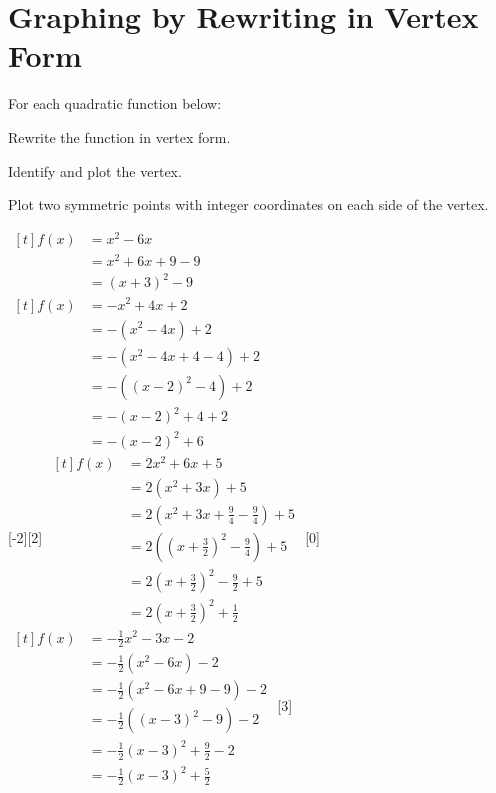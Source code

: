 \section*{Graphing by Rewriting in Vertex Form}
For each quadratic function below:
\begin{clist}
\item Rewrite the function in vertex form.
\item Identify and plot the vertex.
\item Plot two symmetric points with integer coordinates on each side of the vertex.
\end{clist}
\begin{smenum}
\mitemxx
{$\begin{aligned}[t]
f(x)&=x^2-6x\\
&=x^2+6x+9-9\\
&=(x+3)^2-9
\end{aligned}$\\
}
{$\begin{aligned}[t]
f(x)&=-x^2+4x+2\\
&=-\left(x^2-4x\right)+2\\
&=-\left(x^2-4x+4-4\right)+2\\
&=-\left((x-2)^2-4\right)+2\\
&=-(x-2)^2+4+2\\
&=-(x-2)^2+6
\end{aligned}$\\
[-2][2]
}
\mitemxx
{$\begin{aligned}[t]
f(x)&=2x^2+6x+5\\
&=2\left(x^2+3x\right)+5\\
&=2\left(x^2+3x+\tfrac{9}{4}-\tfrac{9}{4}\right)+5\\
&=2\left(\left(x+\tfrac{3}{2}\right)^2-\tfrac{9}{4}\right)+5\\
&=2\left(x+\tfrac{3}{2}\right)^2-\tfrac{9}{2}+5\\
&=2\left(x+\tfrac{3}{2}\right)^2+\tfrac{1}{2}
\end{aligned}$
[0]
}{$\begin{aligned}[t]
f(x)&=-\frac{1}{2}x^2-3x-2\\
&=-\frac{1}{2}\left(x^2-6x\right)-2\\
&=-\frac{1}{2}\left(x^2-6x+9-9\right)-2\\
&=-\frac{1}{2}\left((x-3)^2-9\right)-2\\
&=-\frac{1}{2}(x-3)^2+\frac{9}{2}-2\\
&=-\frac{1}{2}(x-3)^2+\frac{5}{2}
\end{aligned}$
[3]
}
\end{smenum}

